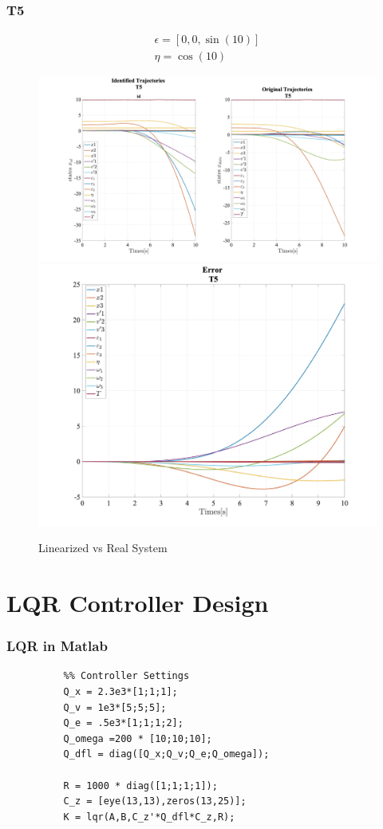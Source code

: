 \documentclass{beamer}
\begin{document}
\begin{frame}
    \frametitle{T5}
    \begin{equation*}
        \begin{array}{c}
            \epsilon = [0, 0, \sin(10)] \\
            \eta = \cos(10)
        \end{array}
    \end{equation*}
    \begin{figure}[htp]
        \centering
        \includegraphics[height=0.30\textwidth]{T5}
        \includegraphics[height=0.30\textwidth]{T5_error}
        \caption{Linearized vs Real System}
        \label{fig:t5}
    \end{figure}
\end{frame}

\section{LQR Controller Design}


\begin{frame}[fragile]{}
    \frametitle{LQR in Matlab}

    \begin{center}
        \begin{minipage}{1\textwidth}
            \begin{verbatim}
          %% Controller Settings 
          Q_x = 2.3e3*[1;1;1];
          Q_v = 1e3*[5;5;5];
          Q_e = .5e3*[1;1;1;2];
          Q_omega =200 * [10;10;10];
          Q_dfl = diag([Q_x;Q_v;Q_e;Q_omega]);
          
          R = 1000 * diag([1;1;1;1]);
          C_z = [eye(13,13),zeros(13,25)];
          K = lqr(A,B,C_z'*Q_dfl*C_z,R);
        \end{verbatim}
        \end{minipage}
    \end{center}

\end{frame}
\end{document}
